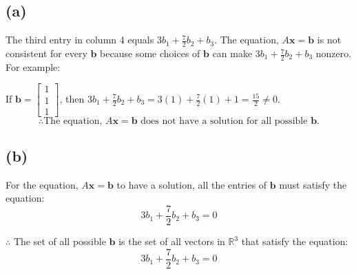 \documentclass[12pt, a4paper]{article}
\begin{document}
\subsection*{(a)}
The third entry in column 4 equals $3b_1+\frac{7}{2}b_2+b_3$. The equation, $A\boldsymbol{x} = \boldsymbol{b}$ is not consistent for every $\boldsymbol{b}$ because some choices of $\boldsymbol{b}$ can make $3b_1+\frac{7}{2}b_2+b_3$ nonzero. For example:

If $\boldsymbol{b} = \begin{bmatrix} 1 \\ 1 \\ 1 \end{bmatrix}$, then $3b_1+\frac{7}{2}b_2+b_3 = 3(1)+\frac{7}{2}(1)+1 = \frac{15}{2} \neq 0$.
\[
    \therefore \text{The equation, } A\boldsymbol{x} = \boldsymbol{b} \text{ does not have a solution for all possible } \boldsymbol{b}.
\]

\subsection*{(b)}
For the equation, $A\boldsymbol{x} = \boldsymbol{b}$ to have a solution, all the entries of $\boldsymbol{b}$ must satisfy the equation:
\[3b_1+\frac{7}{2}b_2+b_3 = 0\]

$\therefore$ The set of all possible $\boldsymbol{b}$ is the set of all vectors in $\mathbb{R}^3$ that satisfy the equation:
\[3b_1+\frac{7}{2}b_2+b_3 = 0\]
\end{document}
